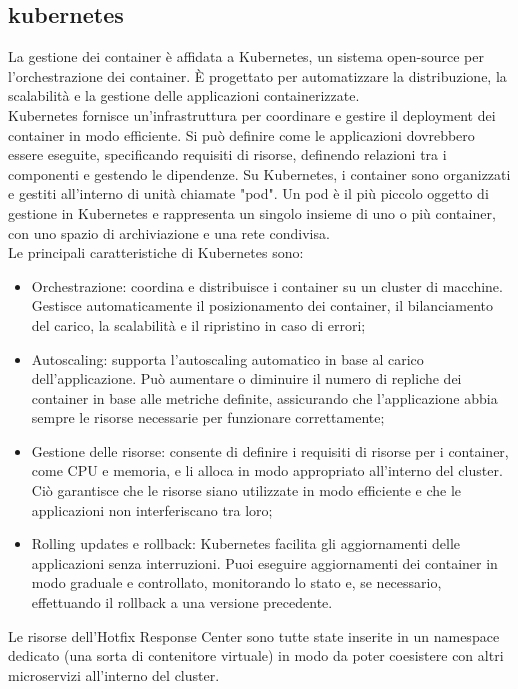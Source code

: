 \subsection{kubernetes}
La gestione dei container è affidata a Kubernetes, un sistema open-source per 
l'orchestrazione dei container. È progettato per automatizzare la distribuzione, 
la scalabilità e la gestione delle applicazioni containerizzate.\\

Kubernetes fornisce un'infrastruttura per coordinare e gestire il deployment 
dei container in modo efficiente. Si può definire come le applicazioni dovrebbero 
essere eseguite, specificando requisiti di risorse, definendo relazioni tra i 
componenti e gestendo le dipendenze.
Su Kubernetes, i container sono organizzati e gestiti all'interno di unità 
chiamate "pod". Un pod è il più piccolo oggetto di gestione in Kubernetes e 
rappresenta un singolo insieme di uno o più container, con uno spazio di 
archiviazione e una rete condivisa.\\

Le principali caratteristiche di  Kubernetes sono:
\begin{itemize}
\item Orchestrazione: coordina e distribuisce i container su un cluster di macchine. Gestisce automaticamente il posizionamento dei container, il bilanciamento del carico, la scalabilità e il ripristino in caso di errori;
\item Autoscaling: supporta l'autoscaling automatico in base al carico dell'applicazione. Può aumentare o diminuire il numero di repliche dei container in base alle metriche definite, assicurando che l'applicazione abbia sempre le risorse necessarie per funzionare correttamente;
\item Gestione delle risorse: consente di definire i requisiti di risorse per i container, come CPU e memoria, e li alloca in modo appropriato all'interno del cluster. Ciò garantisce che le risorse siano utilizzate in modo efficiente e che le applicazioni non interferiscano tra loro;
\item Rolling updates e rollback: Kubernetes facilita gli aggiornamenti delle applicazioni senza interruzioni. Puoi eseguire aggiornamenti dei container in modo graduale e controllato, monitorando lo stato e, se necessario, effettuando il rollback a una versione precedente.
\end{itemize}

Le risorse dell’Hotfix Response Center sono tutte state inserite in un namespace 
dedicato (una sorta di contenitore virtuale) in modo da poter coesistere con 
altri microservizi all'interno del cluster.\\

